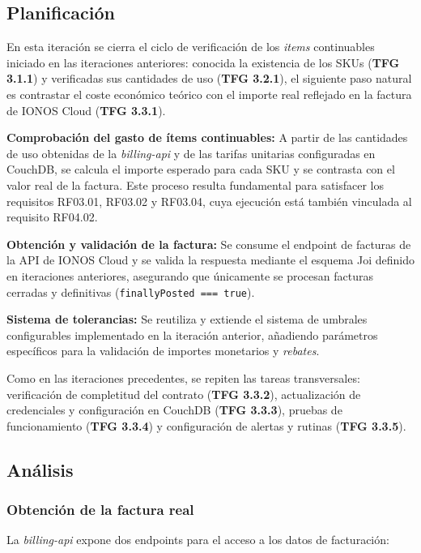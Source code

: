 \subsection{Planificación}

En esta iteración se cierra el ciclo de verificación de los \textit{items} continuables iniciado en las iteraciones anteriores: conocida la existencia de los SKUs (\textbf{TFG 3.1.1}) y verificadas sus cantidades de uso (\textbf{TFG 3.2.1}), el siguiente paso natural es contrastar el coste económico teórico con el importe real reflejado en la factura de IONOS Cloud (\textbf{TFG 3.3.1}).

\textbf{Comprobación del gasto de ítems continuables:} A partir de las cantidades de uso obtenidas de la \textit{billing-api} y de las tarifas unitarias configuradas en CouchDB, se calcula el importe esperado para cada SKU y se contrasta con el valor real de la factura. Este proceso resulta fundamental para satisfacer los requisitos RF03.01, RF03.02 y RF03.04, cuya ejecución está también vinculada al requisito RF04.02.

\textbf{Obtención y validación de la factura:} Se consume el endpoint de facturas de la API de IONOS Cloud y se valida la respuesta mediante el esquema Joi definido en iteraciones anteriores, asegurando que únicamente se procesan facturas cerradas y definitivas (\texttt{finallyPosted === true}).

\textbf{Sistema de tolerancias:} Se reutiliza y extiende el sistema de umbrales configurables implementado en la iteración anterior, añadiendo parámetros específicos para la validación de importes monetarios y \textit{rebates}.

Como en las iteraciones precedentes, se repiten las tareas transversales: verificación de completitud del contrato (\textbf{TFG 3.3.2}), actualización de credenciales y configuración en CouchDB (\textbf{TFG 3.3.3}), pruebas de funcionamiento (\textbf{TFG 3.3.4}) y configuración de alertas y rutinas (\textbf{TFG 3.3.5}).

\subsection{Análisis}

\subsubsection{Obtención de la factura real}

La \textit{billing-api} expone dos endpoints para el acceso a los datos de facturación:

